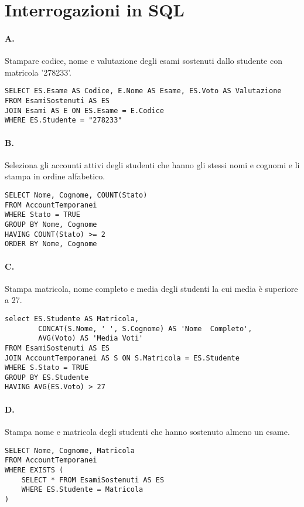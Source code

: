 \section{Interrogazioni in SQL}

\paragraph{A.}
Stampare codice, nome e valutazione degli esami sostenuti dallo
studente con matricola '278233'.

\begin{verbatim}
SELECT ES.Esame AS Codice, E.Nome AS Esame, ES.Voto AS Valutazione
FROM EsamiSostenuti AS ES
JOIN Esami AS E ON ES.Esame = E.Codice
WHERE ES.Studente = "278233"
\end{verbatim}

\paragraph{B.}
Seleziona gli accounti attivi degli studenti che hanno gli
stessi nomi e cognomi e li stampa in ordine alfabetico.

\begin{verbatim}
SELECT Nome, Cognome, COUNT(Stato)
FROM AccountTemporanei
WHERE Stato = TRUE
GROUP BY Nome, Cognome
HAVING COUNT(Stato) >= 2
ORDER BY Nome, Cognome
\end{verbatim}

\paragraph{C.}
Stampa matricola, nome completo e media degli studenti la cui
media è superiore a 27.

\begin{verbatim}
select ES.Studente AS Matricola, 
        CONCAT(S.Nome, ' ', S.Cognome) AS 'Nome  Completo',
        AVG(Voto) AS 'Media Voti'
FROM EsamiSostenuti AS ES
JOIN AccountTemporanei AS S ON S.Matricola = ES.Studente
WHERE S.Stato = TRUE
GROUP BY ES.Studente
HAVING AVG(ES.Voto) > 27
\end{verbatim}

\paragraph{D.}
Stampa nome e matricola degli studenti che hanno sostenuto
almeno un esame.

\begin{verbatim}
SELECT Nome, Cognome, Matricola
FROM AccountTemporanei
WHERE EXISTS (
    SELECT * FROM EsamiSostenuti AS ES
    WHERE ES.Studente = Matricola
)
\end{verbatim}

